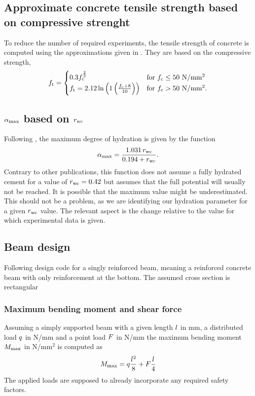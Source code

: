 \subsection{Approximate concrete tensile strength based on compressive strenght}
To reduce the number of required experiments, the tensile strength of concrete is computed using the approximations given in \citeauthor{DIN1992-1-1}.
They are based on the compressive strength, 
\begin{align}
f_{\text{t}} = 
\begin{cases}
0.3 f_{\text{c}}^{\frac{2}{3}}  & \text{for $f_{\text{c}} \le 50$ N/mm$^2$}\\
f_{\text{t}} =2.12 \ln \left( 1 \left( \frac{f_{\text{c}} + 8}{10}\right) \right)& \text{for $f_{\text{c}} > 50$ N/mm$^2$}  \label{eq:tensilstrength}.
\end{cases}
\end{align}
\subsection{$\alpha_{\text{max}}$ based on $r_{\text{wc}}$}
Following \cite{Mills1966fico}, the maximum degree of hydration is given by the function
\begin{align}
	\alpha_{\text{max}} = \dfrac{1.031\,r_{\text{wc}}}{0.194 + r_{\text{wc}}}.
\end{align}
Contrary to other publications, this function does not assume a fully hydrated cement for a value of $r_{\text{wc}} = 0.42$ but assumes that the full potential will usually not be reached.
It is possible that the maximum value might be underestimated.
This should not be a problem, as we are identifying our hydration parameter for a given $r_{\text{wc}}$ value.
The relevant aspect is the change relative to the value for which experimental data is given.
\subsection{Beam design}
Following design code \citeauthor{DIN1992-1-1} for a singly reinforced beam, meaning a reinforced concrete beam with only reinforcement at the bottom.
The assumed cross section is rectangular

\subsubsection{Maximum bending moment and shear force}
Assuming a simply supported beam with a given length $l$ in mm, a distributed load $q$ in N/mm and a point load $F$ in N/mm
the maximum bending moment $M_{\text{max}}$ in N/mm$^2$ is computed as
\begin{align}
	M_{\text{max}}= q \frac{l^2}{8} + F \frac{l}{4}
\end{align}
The applied loads are supposed to already incorporate any required safety factors.
